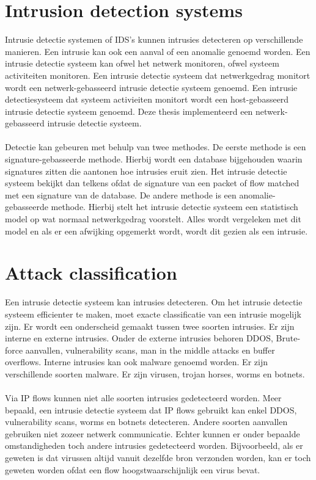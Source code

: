 \begin{samenvatting}
\section{Intrusion detection systems}
Intrusie detectie systemen of IDS's kunnen intrusies detecteren op verschillende manieren. Een intrusie kan ook een aanval of een anomalie genoemd worden. Een intrusie detectie systeem kan ofwel het netwerk monitoren, ofwel systeem activiteiten monitoren. Een intrusie detectie systeem dat netwerkgedrag monitort wordt een netwerk-gebasseerd intrusie detectie systeem genoemd. Een intrusie detectiesysteem dat systeem activieiten monitort wordt een host-gebasseerd intrusie detectie systeem genoemd. Deze thesis implementeerd een netwerk-gebasseerd intrusie detectie systeem. \\
\\
Detectie kan gebeuren met behulp van twee methodes. De eerste methode is een signature-gebasseerde methode. Hierbij wordt een database bijgehouden waarin signatures zitten die aantonen hoe intrusies eruit zien. Het intrusie detectie systeem bekijkt dan telkens ofdat de signature van een packet of flow matched met een signature van de database. De andere methode is een anomalie-gebasseerde methode. Hierbij stelt het intrusie detectie systeem een statistisch model op wat normaal netwerkgedrag voorstelt. Alles wordt vergeleken met dit model en als er een afwijking opgemerkt wordt, wordt dit gezien als een intrusie.

\section{Attack classification}
Een intrusie detectie systeem kan intrusies detecteren. Om het intrusie detectie systeem efficienter te maken, moet exacte classificatie van een intrusie mogelijk zijn. Er wordt een onderscheid gemaakt tussen twee soorten intrusies. Er zijn interne en externe intrusies. Onder de externe intrusies behoren DDOS, Brute-force aanvallen, vulnerability scans, man in the middle attacks en buffer overflows. Interne intrusies kan ook malware genoemd worden. Er zijn verschillende soorten malware. Er zijn virusen, trojan horses, worms en botnets. \\
\\
Via IP flows kunnen niet alle soorten intrusies gedetecteerd worden. Meer bepaald, een intrusie detectie systeem dat IP flows gebruikt kan enkel DDOS, vulnerability scans, worms en botnets detecteren. Andere soorten aanvallen gebruiken niet zozeer netwerk communicatie. Echter kunnen er onder bepaalde omstandigheden toch andere intrusies gedetecteerd worden. Bijvoorbeeld, als er geweten is dat virussen altijd vanuit dezelfde bron verzonden worden, kan er toch geweten worden ofdat een flow hoogstwaarschijnlijk een virus bevat.


\end{samenvatting}
